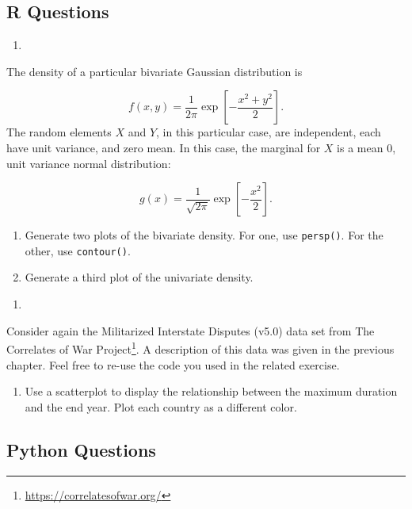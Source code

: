\documentclass[
  12pt,
  krantz2]{krantz}
\providecommand{\tightlist}{%
  \setlength{\itemsep}{0pt}\setlength{\parskip}{0pt}}
\renewcommand{\href}[2]{#2\footnote{\url{#1}}}
\begin{document}
\hypertarget{r-questions-10}{%
\subsection{R Questions}\label{r-questions-10}}

\begin{enumerate}
\def\labelenumi{\arabic{enumi}.}
\tightlist
\item
\end{enumerate}

The density of a particular bivariate Gaussian distribution is

\[
f(x,y) = \frac{1}{2 \pi}  \exp\left[ -\frac{x ^2 + y^2}{2}     \right] \tag{1}.
\]
The random elements \(X\) and \(Y\), in this particular case, are independent, each have unit variance, and zero mean. In this case, the marginal for \(X\) is a mean \(0\), unit variance normal distribution:

\[
g(x) = \frac{1}{\sqrt{2\pi}} \exp\left[ -\frac{x ^2 }{2}     \right] \tag{2}.
\]

\begin{enumerate}
\def\labelenumi{\alph{enumi})}
\tightlist
\item
  Generate two plots of the bivariate density. For one, use \texttt{persp()}. For the other, use \texttt{contour()}.
\item
  Generate a third plot of the univariate density.
\end{enumerate}

\begin{enumerate}
\def\labelenumi{\arabic{enumi}.}
\setcounter{enumi}{1}
\tightlist
\item
\end{enumerate}

Consider again the Militarized Interstate Disputes (v5.0) \citep{mid5} data set from \href{https://correlatesofwar.org/}{The Correlates of War Project}. A description of this data was given in the previous chapter. Feel free to re-use the code you used in the related exercise.

\begin{enumerate}
\def\labelenumi{\alph{enumi})}
\tightlist
\item
  Use a scatterplot to display the relationship between the maximum duration and the end year. Plot each country as a different color.
\end{enumerate}

\hypertarget{python-questions-10}{%
\subsection{Python Questions}\label{python-questions-10}}
\end{document}
